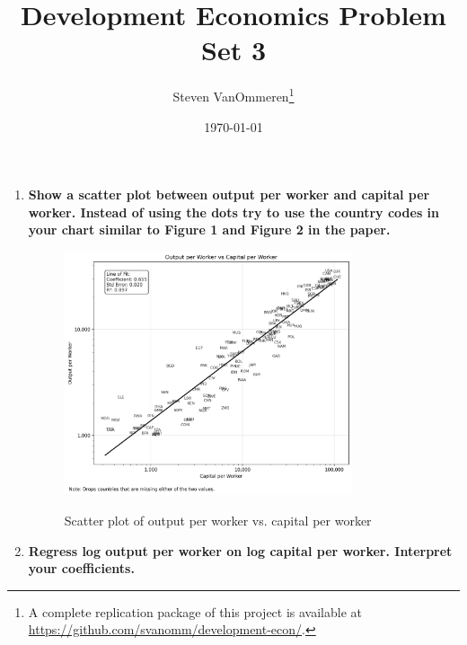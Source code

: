 \documentclass[12pt]{article}
\begin{document}
\title{Development Economics Problem Set 3}
\author{Steven VanOmmeren\thanks{A complete replication package of this project is available at \url{https://github.com/svanomm/development-econ/}.}}
\date{\today}
\maketitle

\doublespacing
\noindent

\begin{enumerate}
    \item \textbf{Show a scatter plot between output per worker and capital per worker. Instead of using the dots try to use the country codes in your chart similar to Figure 1 and Figure 2 in the paper.}
    \begin{figure}[H]
        \centering
        \caption{Scatter plot of output per worker vs. capital per worker}
        \includegraphics[width=0.8\textwidth]{output_vs_capital_scatter.png}
        \label{fig:scatter_output_capital}
    \end{figure}

    \item \textbf{Regress log output per worker on log capital per worker. Interpret your coefficients.}
    
    
    


\end{enumerate}
\end{document}
